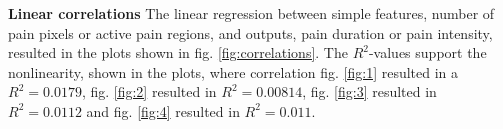 \textbf{Linear correlations}\newline
\noindent
The linear regression between simple features, number of pain pixels or active pain regions, and outputs, pain duration or pain intensity, resulted in the plots shown in fig. \ref{fig:correlations}. The $R^2$-values support the nonlinearity, shown in the plots, where correlation fig. \ref{fig:1} resulted in a $R^2 = 0.0179$, fig. \ref{fig:2} resulted in $R^2 = 0.00814$, fig. \ref{fig:3} resulted in $R^2 = 0.0112$ and fig. \ref{fig:4} resulted in $R^2 =  0.011$. \\

\begin{figure} [t!]
\end{figure}
